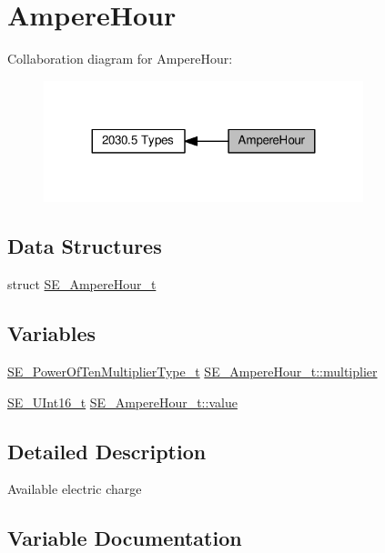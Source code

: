 \hypertarget{group__AmpereHour}{}\section{Ampere\+Hour}
\label{group__AmpereHour}
Collaboration diagram for Ampere\+Hour\+:\nopagebreak
\begin{figure}[H]
\begin{center}
\leavevmode
\includegraphics[width=263pt]{group__AmpereHour}
\end{center}
\end{figure}
\subsection*{Data Structures}
\begin{DoxyCompactItemize}
\item 
struct \hyperlink{structSE__AmpereHour__t}{S\+E\+\_\+\+Ampere\+Hour\+\_\+t}
\end{DoxyCompactItemize}
\subsection*{Variables}
\begin{DoxyCompactItemize}
\item 
\hyperlink{group__PowerOfTenMultiplierType_gaf0317b781dc8dbb9cb6ac4e44a14fdef}{S\+E\+\_\+\+Power\+Of\+Ten\+Multiplier\+Type\+\_\+t} \hyperlink{group__AmpereHour_gab701095c4caf275675fc1cc3943a6dad}{S\+E\+\_\+\+Ampere\+Hour\+\_\+t\+::multiplier}
\item 
\hyperlink{group__UInt16_gac68d541f189538bfd30cfaa712d20d29}{S\+E\+\_\+\+U\+Int16\+\_\+t} \hyperlink{group__AmpereHour_gabdf24e7f494b6811f2c47bf098afd789}{S\+E\+\_\+\+Ampere\+Hour\+\_\+t\+::value}
\end{DoxyCompactItemize}


\subsection{Detailed Description}
Available electric charge 

\subsection{Variable Documentation}
\mbox{\label{group__AmpereHour_gab701095c4caf275675fc1cc3943a6dad}} 
